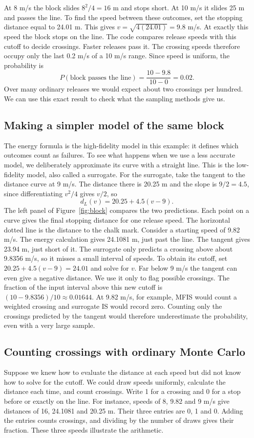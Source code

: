 \documentclass[11pt,a4paper]{article}
\begin{document}
At 8 m/s the block slides $8^2/4=16$ m and stops short. At 10 m/s it slides 25 m and passes the line. To find the speed between these outcomes, set the stopping distance equal to 24.01 m. This gives $v=\sqrt{4(24.01)}=9.8$ m/s. At exactly this speed the block stops on the line. The code compares release speeds with this cutoff to decide crossings. Faster releases pass it. The crossing speeds therefore occupy only the last 0.2 m/s of a 10 m/s range. Since speed is uniform, the probability is
\[
P(\text{block passes the line})=\frac{10-9.8}{10-0}=0.02.
\]
Over many ordinary releases we would expect about two crossings per hundred. We can use this exact result to check what the sampling methods give us.

\subsection{Making a simpler model of the same block}
The energy formula is the high-fidelity model in this example: it defines which outcomes count as failures. To see what happens when we use a less accurate model, we deliberately approximate its curve with a straight line. This is the low-fidelity model, also called a surrogate. For the surrogate, take the tangent to the distance curve at 9 m/s. The distance there is 20.25 m and the slope is $9/2=4.5$, since differentiating $v^2/4$ gives $v/2$, so
\begin{equation}
d_L(v)=20.25+4.5(v-9).
\end{equation}
The left panel of Figure~\ref{fig:block} compares the two predictions. Each point on a curve gives the final stopping distance for one release speed. The horizontal dotted line is the distance to the chalk mark. Consider a starting speed of 9.82 m/s. The energy calculation gives 24.1081 m, just past the line. The tangent gives 23.94 m, just short of it. The surrogate only predicts a crossing above about 9.8356 m/s, so it misses a small interval of speeds. To obtain its cutoff, set $20.25+4.5(v-9)=24.01$ and solve for $v$. Far below 9 m/s the tangent can even give a negative distance. We use it only to flag possible crossings. The fraction of the input interval above this new cutoff is $(10-9.8356)/10\approx0.01644$. At 9.82 m/s, for example, MFIS would count a weighted crossing and surrogate IS would record zero. Counting only the crossings predicted by the tangent would therefore underestimate the probability, even with a very large sample.

\subsection{Counting crossings with ordinary Monte Carlo}
Suppose we knew how to evaluate the distance at each speed but did not know how to solve for the cutoff. We could draw speeds uniformly, calculate the distance each time, and count crossings. Write 1 for a crossing and 0 for a stop before or exactly on the line. For instance, speeds of 8, 9.82 and 9 m/s give distances of 16, 24.1081 and 20.25 m. Their three entries are 0, 1 and 0. Adding the entries counts crossings, and dividing by the number of draws gives their fraction. These three speeds illustrate the arithmetic.
\end{document}
